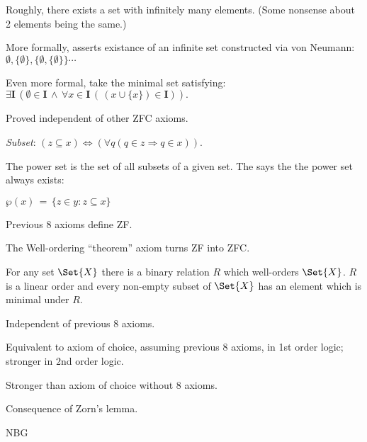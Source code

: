 Roughly, there exists a set with infinitely many 
elements\cite{wiki:Axiom_of_infinity}.
(Some nonsense about 2 elements being the same.)

More formally, asserts existance of an infinite set 
constructed via von Neumann:
$\emptyset, \{\emptyset\}, \{ \emptyset, \{\emptyset\} \} \cdots$

Even more formal, take the minimal set satisfying:
${\displaystyle 
\exists \mathbf {I}
 \,(\emptyset \in \mathbf {I}
 \,\land \,
 \forall x\in \mathbf {I} \,
 (\,(x\cup \{x\})\in \mathbf {I} )).}$
 
 Proved independent of other \textsf{ZFC} axioms.
 
 
\label{sec:Axiom-of-power-set}

\textsl{Subset}:
$(z\subseteq x)
 \Leftrightarrow 
 (\forall q(q\in z\Rightarrow q\in x)).$
 
The power set is the set of all subsets of a given set.
The  says the the power set
always exists\cite{wiki:Axiom_of_power_set}:

${\displaystyle \wp(x) \,=\, \{z\in y:z\subseteq x\}}$

\label{sec:Well_ordering_theorem}

Previous 8 axioms define \textsf{ZF}.

The Well-ordering ``theorem'' axiom turns \textsf{ZF}
into \textsf{ZFC}\cite{wiki:Well_ordering_theorem}.

For any set $\Set{X}$ there is a binary relation $R$ which
 well-orders $\Set{X}$.
 $R$ is a linear order and every non-empty subset of $\Set{X}$
 has an element which is minimal under $R$.

Independent of previous 8 axioms.

Equivalent to axiom of choice\cite{wiki:Axiom_of_choice}, 
assuming previous 8 axioms, in 1st order logic;
stronger in $2$nd order logic.

Stronger than axiom of choice without 8 axioms.

Consequence of Zorn's lemma\cite{wiki:Zorns_lemma}.

\label{vonNeumann-Bernays-Godel_set_theory}
\textsf{NBG}\cite{wiki:NBG-set-theory}

